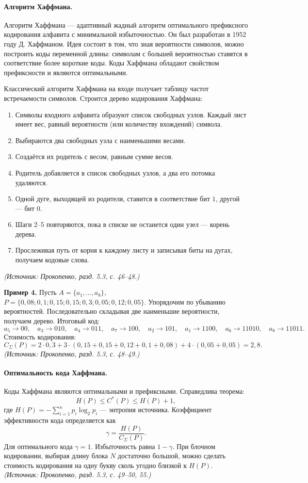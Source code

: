 \documentclass[a4paper,12pt]{article}
\begin{document}
\paragraph{Алгоритм Хаффмана.}
Алгоритм Хаффмана — адаптивный жадный алгоритм оптимального префиксного кодирования алфавита с минимальной избыточностью. Он был разработан в 1952 году Д. Хаффманом. Идея состоит в том, что зная вероятности символов, можно построить коды переменной длины: символам с большей вероятностью ставятся в соответствие более короткие коды. Коды Хаффмана обладают свойством префиксности и являются оптимальными.

Классический алгоритм Хаффмана на входе получает таблицу частот встречаемости символов. Строится дерево кодирования Хаффмана:
\begin{enumerate}[label=\arabic*)]
\item Символы входного алфавита образуют список свободных узлов. Каждый лист имеет вес, равный вероятности (или количеству вхождений) символа.
\item Выбираются два свободных узла с наименьшими весами.
\item Создаётся их родитель с весом, равным сумме весов.
\item Родитель добавляется в список свободных узлов, а два его потомка удаляются.
\item Одной дуге, выходящей из родителя, ставится в соответствие бит \(1\), другой — бит \(0\).
\item Шаги 2–5 повторяются, пока в списке не останется один узел — корень дерева.
\item Прослеживая путь от корня к каждому листу и записывая биты на дугах, получаем кодовые слова.
\end{enumerate}
\textit{(Источник: Прокопенко, разд. 5.3, с. 46--48.)}

\textbf{Пример 4.} Пусть \(A=\{a_1,\dots,a_8\}\), \(P=\{0{,}08;0{,}1;0{,}15;0{,}15;0{,}3;0{,}05;0{,}12;0{,}05\}\). Упорядочим по убыванию вероятностей. Последовательно складывая две наименьшие вероятности, получаем дерево. Итоговый код:
\[
a_5\to 00,\quad a_3\to 010,\quad a_4\to 011,\quad a_7\to 100,\quad a_2\to 101,\quad a_1\to 1100,\quad a_6\to 11010,\quad a_8\to 11011.
\]
Стоимость кодирования:
\[
C_\Sigma(P)=2\cdot0{,}3+3\cdot(0{,}15+0{,}15+0{,}12+0{,}1+0{,}08)+4\cdot(0{,}05+0{,}05)=2{,}8.
\]
\textit{(Источник: Прокопенко, разд. 5.3, с. 48--49.)}

\paragraph{Оптимальность кода Хаффмана.}
Коды Хаффмана являются оптимальными и префиксными. Справедлива теорема:
\[
H(P)\le C^*(P)\le H(P)+1,
\]
где \(H(P)=-\sum_{i=1}^n p_i\log_2 p_i\) — энтропия источника. Коэффициент эффективности кода определяется как
\[
\gamma=\frac{H(P)}{C_\Sigma(P)}.
\]
Для оптимального кода \(\gamma=1\). Избыточность равна \(1-\gamma\). При блочном кодировании, выбирая длину блока \(N\) достаточно большой, можно сделать стоимость кодирования на одну букву сколь угодно близкой к \(H(P)\).
\textit{(Источник: Прокопенко, разд. 5.3, с. 49--50, 55.)}
\end{document}
